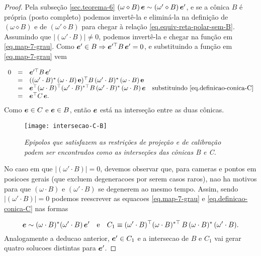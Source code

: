 \begin{proof}
Pela subseção \ref{sec.teorema-6} $(\omega\diamond B)\,\boldsymbol{e}\sim(\omega'\diamond B)\,\boldsymbol{e}'$, e se a cônica $B$ é própria (posto completo) podemos invertê-la e eliminá-la na definição de $(\omega\diamond B)$ e de $(\omega'\diamond B)$ para chegar à relação \ref{eq.equiv-reta-polar-sem-B}. Assumindo que $|(\omega'\cdot B)|\neq0$, podemos invertê-la e chegar na função em \ref{eq.map-7-grau}. Como $\boldsymbol{e}'\in B\Rightarrow \boldsymbol{e}'^\top B\,\boldsymbol{e}'=0$, e substituindo a função em \ref{eq.map-7-grau} vem

\begin{equation*}
\begin{array}{rcl}
0&=&\boldsymbol{e}'^\top B\,\boldsymbol{e}'\\
&=&((\omega' \cdot B)^*\,(\omega \cdot B)\,{\bf e})^\top B\,(\omega' \cdot B)^*\,(\omega \cdot B)\,{\bf e}\\
&=&\boldsymbol{e}^\top (\omega \cdot B)^\top (\omega' \cdot B)^{*\top}B\,(\omega' \cdot B)^*\,(\omega \cdot B)\,\boldsymbol{e} \quad \text{substituindo} \,\,\ref{eq.definicao-conica-C}\\
&=&\boldsymbol{e}^\top C\,\boldsymbol{e}.
\end{array}
\end{equation*}  
Como $\boldsymbol{e} \in C$ e $\boldsymbol{e}\in B$, então $\boldsymbol{e}$ está na interseção entre as duas cônicas.


\begin{figure}[!htb]
\centering
\texttt{[image: intersecao-C-B]}
\caption{\textit{Epipolos que satisfazem as restrições de projeção e de calibração podem ser encontrados como as interseções das cônicas B e C.}}
\label{inter-B-C}
\end{figure}

No caso em que $|(\omega'\cdot B)|=0$, devemos observar que, para cameras e pontos em posicoes gerais (que excluem degeneracoes por serem casos raros), nao ha motivos para que $(\omega\cdot B)$ e $(\omega'\cdot B)$ se degenerem ao mesmo tempo. Assim, sendo $|(\omega'\cdot B)|=0$ podemos reescrever as equacoes \ref{eq.map-7-grau} e \ref{eq.definicao-conica-C} nas formas

\begin{equation*}
\boldsymbol{e}\sim (\omega\cdot B)^*(\omega'\cdot B)\,\boldsymbol{e}'\quad\text{e}\quad C_1 \equiv (\omega' \cdot B)^\top (\omega \cdot B)^{*\top}\,B\,(\omega \cdot B)^*\,(\omega' \cdot B).
\end{equation*}     
Analogamente a deducao anterior, $\boldsymbol{e}'\in C_1$ e a intersecao de $B$ e $C_1$ vai gerar quatro solucoes distintas para $\boldsymbol{e}'$.
 

\end{proof}
